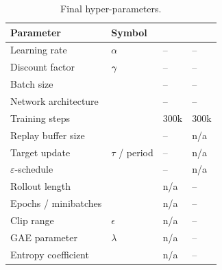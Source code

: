 \begin{table}[H]
  \centering
  \caption{Final hyper-parameters.}
  \label{tab:hyperparameters}
  \begin{tabular}{@{}llll@{}}
    \toprule
    Parameter & Symbol & \ddqn{} & \ppo{} \\
    \midrule
    Learning rate        & $\alpha$ & -- & -- \\
    Discount factor      & $\gamma$   & -- & -- \\
    Batch size           &          & -- & -- \\
    Network architecture &          & -- & -- \\
    Training steps       &          & 300k & 300k \\
    \midrule
    Replay buffer size   &          & -- & n/a \\
    Target update        & $\tau$ / period & -- & n/a \\
    $\varepsilon$-schedule &        & -- & n/a \\
    \midrule
    Rollout length       &          & n/a & -- \\
    Epochs / minibatches &          & n/a & -- \\
    Clip range           & $\epsilon$ & n/a & -- \\
    GAE parameter        & $\lambda$ & n/a & -- \\
    Entropy coefficient  &          & n/a & -- \\
    \bottomrule
  \end{tabular}
\end{table}
